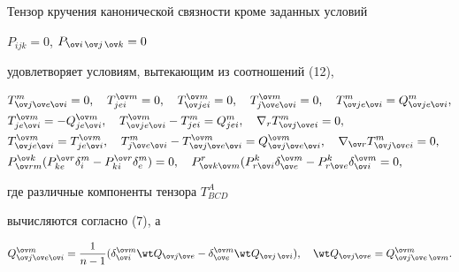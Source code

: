 Тензор кручения канонической связности кроме заданных условий


$P_{ijk}=0$, $P_{\ov i\,\ov j\,\ov k}=0$


удовлетворяет условиям, вытекающим из соотношений (12),


\begin{equation}


\begin{split}


& T^m_{\ov j\ov e\ov i}=0,\quad T^{\ov m}_{jei}=0,\quad


T^{\ov m}_{\ov j ei}=0,\quad T^{\ov m}_{j\ov e\ov i}=0,\quad


T^m_{\ov j e\ov i}=Q^m_{\ov j e\ov i}, \\


& T^{\ov m}_{j e\ov i}=-Q^{\ov m}_{j e\ov i},\quad


T^{\ov m}_{\ov j e\ov i}-T^m_{jei}=Q^m_{jei},\quad


\nabla_r T^m_{\ov j\ov e i}=0, \\


& T^{\ov m}_{\ov j e\ov i}=T^{\ov m}_{j e\ov i},\quad


T^m_{j\ov e\ov i}-T^{\ov m}_{\ov j\ov e\ov i}=


Q^{\ov m}_{\ov j\ov e\ov i},\quad


\nabla_{\ov r}T^m_{\ov j\ov e i}=0, \\


& P^{\ov k}_{\ov r m}(P^{\ov r}_{ke}\delta^m_i-


P^{\ov r}_{ki}\delta^m_e)=0,\quad


P^r_{\ov k\ov m}(P^k_{r\ov i}\delta^{\ov m}_{\ov e}-


P^k_{r\ov e}\delta^{\ov m}_{\ov i}=0,


\end{split}


\end{equation}


где различные компоненты тензора $T^A_{BCD}$


вычисляются согласно (7), а


$$


Q^{\ov m}_{\ov j\ov e\ov i}=\frac{1}{n-1}


(\delta^{\ov m}_{\ov i}\wt Q_{\ov j\ov e}-\delta^{\ov m}_{\ov e}


\wt Q_{\ov j\,\ov i}),\quad


\wt Q_{\ov j\ov e}=Q^{\ov m}_{\ov j\ov e\,\ov m}.


$$





